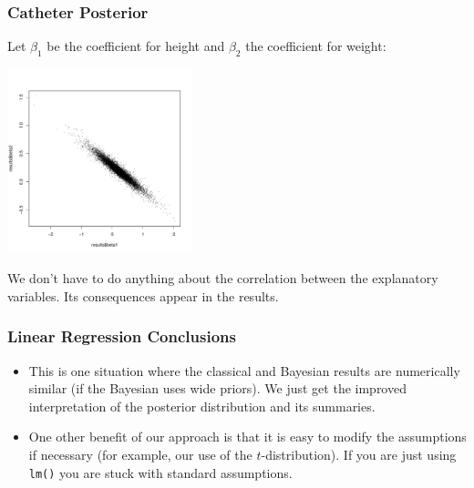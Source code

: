 \documentclass{beamer}
\begin{document}
\begin{frame}
\frametitle{Catheter Posterior}
Let $\beta_1$ be the coefficient for height and $\beta_2$ the coefficient
for weight:
\begin{center}
\includegraphics[width=0.4\textwidth]{images/catheter_posterior.pdf}
\end{center}
We don't have to do anything about the correlation between
the explanatory variables. Its consequences appear in the results.

\end{frame}


\begin{frame}
\frametitle{Linear Regression Conclusions}
\begin{itemize}
\item This is one situation where the classical and Bayesian results are
numerically similar (if the Bayesian uses wide priors). We just get the
improved interpretation of the posterior distribution and its summaries.\pause
\item One other benefit of our approach is that it is easy to modify the
assumptions if necessary (for example, our use of the $t$-distribution).
If you are just using \texttt{lm()} you
are stuck with standard assumptions.
\end{itemize}

\end{frame}
\end{document}
